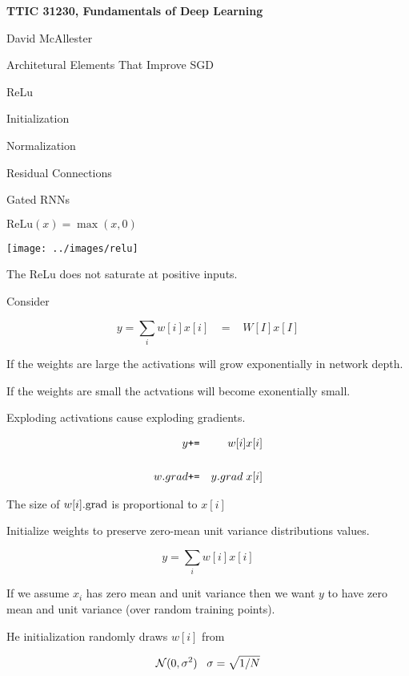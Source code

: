 




{\Huge

  \centerline{\bf TTIC 31230, Fundamentals of Deep Learning}
  \bigskip
  \centerline{David McAllester}
  \vfill
  \centerline{Architetural Elements That Improve SGD}
  \vfill
  \vfill
  \centerline{ReLu}
  \vfill
  \centerline{Initialization}
  \vfill
  \centerline{Normalization}
  \vfill
  \centerline{Residual Connections}
  \vfill
  \centerline{Gated RNNs}


$\mathrm{ReLu}(x) = \max(x,0)$

\vfill
\centerline{\texttt{[image: ../images/relu]}}

\vfill
The ReLu does not saturate at positive inputs.


Consider

\vfill
$$y = \sum_i w[i]x[i]  \;\;\;= \;\;\; W[I]x[I]$$

\vfill
If the weights are large the activations will grow exponentially in network depth.

\vfill
If the weights are small the actvations will become exonentially small.


Exploding activations cause exploding gradients.

\begin{eqnarray*}
y  & \mbox{\tt +=} & w[i]x[i] \\
\\
w.grad & \mbox{\tt +=} & y.grad \; x[i]
\end{eqnarray*}

\vfill
The size of $w[i].\mathrm{grad}$ is proportional to $x[i]$


Initialize weights to preserve zero-mean unit variance distributions values.

$$y = \sum_i w[i]x[i]$$

\vfill
If we assume $x_i$ has zero mean and unit variance then we want $y$
to have zero mean and unit variance (over random training points).

\vfill
He initialization randomly draws $w[i]$ from

$${\cal N}(0,\sigma^2)\;\;\;\sigma = \sqrt{1/N}$$

}
